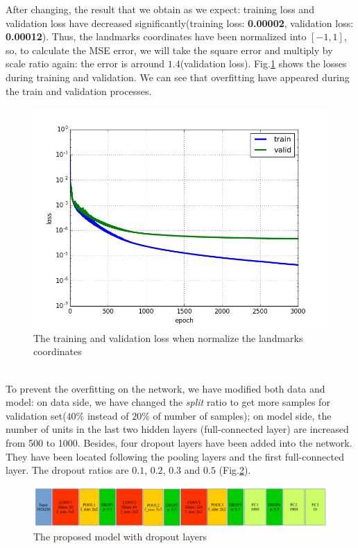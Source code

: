 After changing, the result that we obtain as we expect: training loss and validation loss have decreased significantly(training loss: \textbf{0.00002}, validation loss: \textbf{0.00012}). Thus, the landmarks coordinates have been normalized into $[-1,1]$, so, to calculate the MSE error, we will take the square error and multiply by scale ratio again: the error is arround $1.4$(validation loss). Fig.\ref{tvlscaletarget} shows the losses during training and validation. We can see that overfitting have appeared during the train and validation processes.
\begin{figure}[h!]
	\centering
	\includegraphics[scale=0.5]{images/figure_1_cnn3_3000_v13_loss_change2}
	\caption{The training and validation loss when normalize the landmarks coordinates}
	\label{tvlscaletarget}
\end{figure}~\\
To prevent the overfitting on the network, we have modified both data and model: on data side, we have changed the \textit{split} ratio to get more samples for validation set($40\%$ instead of $20\%$ of number of samples); on model side, the number of units in the last two hidden layers (full-connected layer) are increased from 500 to 1000. Besides, four dropout layers have been added into the network. They have been located following the pooling layers and the first full-connected layer. The dropout ratios are $0.1$, $0.2$, $0.3$ and $0.5$ (Fig.\ref{model3dropout}).
\begin{figure}[h!]
	\centering
	\includegraphics[scale=0.35]{images/model3_dropout}
	\caption{The proposed model with dropout layers}
	\label{model3dropout}
\end{figure}~\\
